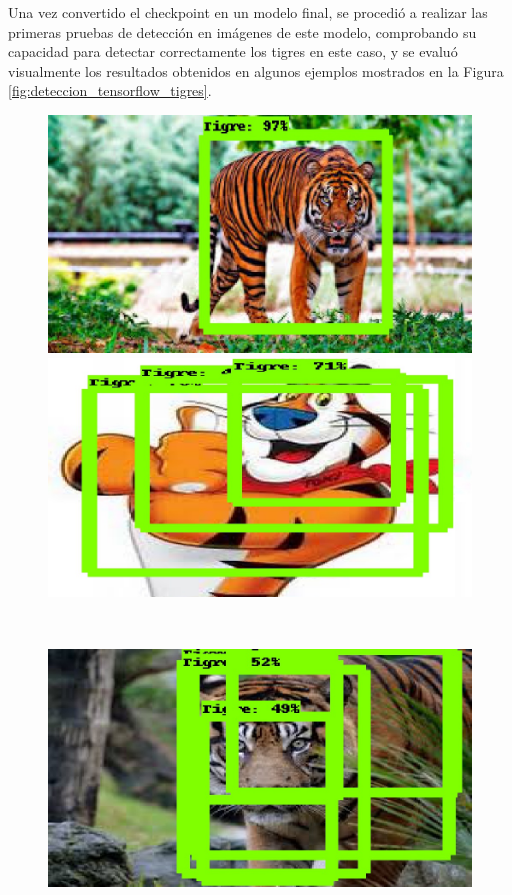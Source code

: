 Una vez convertido el checkpoint en un modelo final, se procedió a realizar las primeras pruebas de detección en imágenes de este modelo, comprobando su capacidad para detectar correctamente los tigres en este caso, y se evaluó visualmente los resultados obtenidos en algunos ejemplos mostrados en la Figura \ref{fig:deteccion_tensorflow_tigres}.

  \begin{figure}[H]
  \centering
  \begin{minipage}{0.46\textwidth}
    \centering
    \includegraphics[width=\linewidth]{figs/tigre_1.jpeg}
  \end{minipage}
  \hspace{2mm}
  \begin{minipage}{0.46\textwidth}
    \centering
    \includegraphics[width=\linewidth]{figs/tigre_2.jpeg}
  \end{minipage}
  \\[4mm] %
  \begin{minipage}{0.46\textwidth}
    \centering
    \includegraphics[width=\linewidth]{figs/tigre_4.jpeg}

\end{minipage}
\end{figure}
